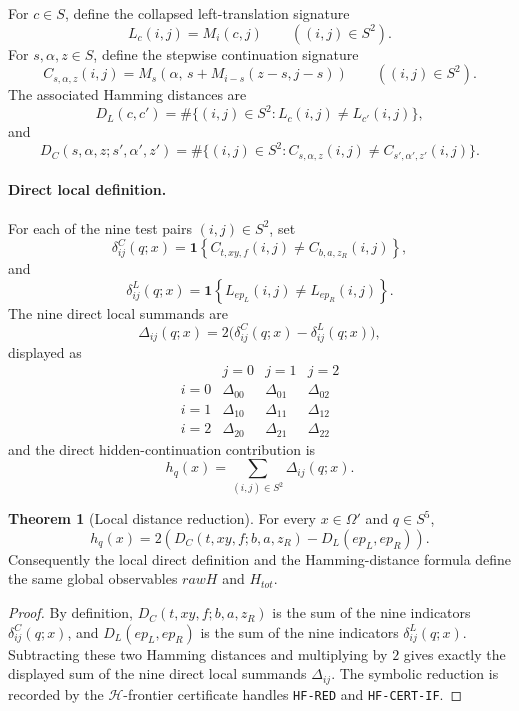 \documentclass[11pt]{article}
\theoremstyle{definition}
\newtheorem{theorem}{Theorem}[section]
\begin{document}
For \(c\in S\), define the collapsed left-translation signature
\[
L_c(i,j)=M_i(c,j)
\qquad ((i,j)\in S^2).
\]
For \(s,\alpha,z\in S\), define the stepwise continuation signature
\[
C_{s,\alpha,z}(i,j)
=
M_s\!\left(
\alpha,\,
s+M_{i-s}(z-s,j-s)
\right)
\qquad ((i,j)\in S^2).
\]
The associated Hamming distances are
\[
D_L(c,c')
=
\#\{(i,j)\in S^2:L_c(i,j)\ne L_{c'}(i,j)\},
\]
and
\[
D_C(s,\alpha,z;s',\alpha',z')
=
\#\{(i,j)\in S^2:
C_{s,\alpha,z}(i,j)\ne C_{s',\alpha',z'}(i,j)\}.
\]

\paragraph{Direct local definition.}
For each of the nine test pairs \((i,j)\in S^2\), set
\[
\delta^C_{ij}(q;x)
=
\mathbf 1\!\left\{
C_{t,xy,f}(i,j)\ne C_{b,a,z_R}(i,j)
\right\},
\]
and
\[
\delta^L_{ij}(q;x)
=
\mathbf 1\!\left\{
L_{ep_L}(i,j)\ne L_{ep_R}(i,j)
\right\}.
\]
The nine direct local summands are
\[
\Delta_{ij}(q;x)=2\bigl(\delta^C_{ij}(q;x)-\delta^L_{ij}(q;x)\bigr),
\]
displayed as
\[
\begin{array}{c|ccc}
 & j=0 & j=1 & j=2\\
\hline
i=0 & \Delta_{00} & \Delta_{01} & \Delta_{02}\\
i=1 & \Delta_{10} & \Delta_{11} & \Delta_{12}\\
i=2 & \Delta_{20} & \Delta_{21} & \Delta_{22}
\end{array}
\]
and the direct hidden-continuation contribution is
\[
h_q(x)
=
\sum_{(i,j)\in S^2}\Delta_{ij}(q;x).
\]

\begin{theorem}[Local distance reduction]
\label{thm:7.1}
For every \(x\in\Omega'\) and \(q\in S^5\),
\[
\boxed{
h_q(x)=
2\left(
D_C(t,xy,f;b,a,z_R)-D_L(ep_L,ep_R)
\right).
}
\]
Consequently the local direct definition and the Hamming-distance formula
define the same global observables \(rawH\) and \(H_{tot}\).
\end{theorem}

\begin{proof}
By definition, \(D_C(t,xy,f;b,a,z_R)\) is the sum of the nine indicators
\(\delta^C_{ij}(q;x)\), and \(D_L(ep_L,ep_R)\) is the sum of the nine
indicators \(\delta^L_{ij}(q;x)\). Subtracting these two Hamming
distances and multiplying by \(2\) gives exactly the displayed sum of
the nine direct local summands \(\Delta_{ij}\). The symbolic reduction is recorded by the \(\mathcal H\)-frontier
certificate handles \texttt{HF-RED} and \texttt{HF-CERT-IF}.
\end{proof}
\end{document}
